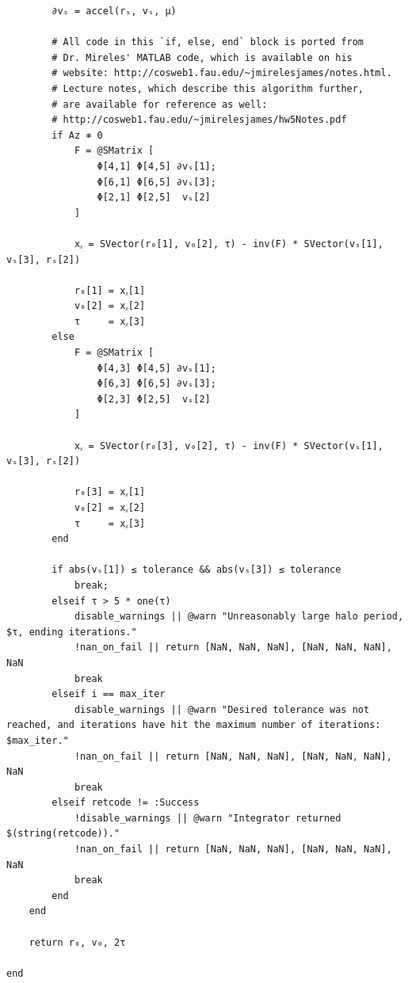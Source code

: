 \documentclass[conf]{new-aiaa}
\begin{document}
\begin{verbatim}
        ∂vₛ = accel(rₛ, vₛ, μ)

        # All code in this `if, else, end` block is ported from
        # Dr. Mireles' MATLAB code, which is available on his 
        # website: http://cosweb1.fau.edu/~jmirelesjames/notes.html.
        # Lecture notes, which describe this algorithm further,
        # are available for reference as well:
        # http://cosweb1.fau.edu/~jmirelesjames/hw5Notes.pdf
        if Az ≉ 0
            F = @SMatrix [
                Φ[4,1] Φ[4,5] ∂vₛ[1];
                Φ[6,1] Φ[6,5] ∂vₛ[3];
                Φ[2,1] Φ[2,5]  vₛ[2]
            ]

            xᵪ = SVector(r₀[1], v₀[2], τ) - inv(F) * SVector(vₛ[1], vₛ[3], rₛ[2])

            r₀[1] = xᵪ[1]
            v₀[2] = xᵪ[2]
            τ     = xᵪ[3]
        else
            F = @SMatrix [
                Φ[4,3] Φ[4,5] ∂vₛ[1];
                Φ[6,3] Φ[6,5] ∂vₛ[3];
                Φ[2,3] Φ[2,5]  vₛ[2]
            ]

            xᵪ = SVector(r₀[3], v₀[2], τ) - inv(F) * SVector(vₛ[1], vₛ[3], rₛ[2])

            r₀[3] = xᵪ[1]
            v₀[2] = xᵪ[2]
            τ     = xᵪ[3]
        end

        if abs(vₛ[1]) ≤ tolerance && abs(vₛ[3]) ≤ tolerance
            break;
        elseif τ > 5 * one(τ)
            disable_warnings || @warn "Unreasonably large halo period, $τ, ending iterations."
            !nan_on_fail || return [NaN, NaN, NaN], [NaN, NaN, NaN], NaN
            break
        elseif i == max_iter
            disable_warnings || @warn "Desired tolerance was not reached, and iterations have hit the maximum number of iterations: $max_iter."
            !nan_on_fail || return [NaN, NaN, NaN], [NaN, NaN, NaN], NaN
            break
        elseif retcode != :Success
            !disable_warnings || @warn "Integrator returned $(string(retcode))."
            !nan_on_fail || return [NaN, NaN, NaN], [NaN, NaN, NaN], NaN    
            break        
        end
    end

    return r₀, v₀, 2τ

end    
\end{verbatim}
\newpage
\end{document}
